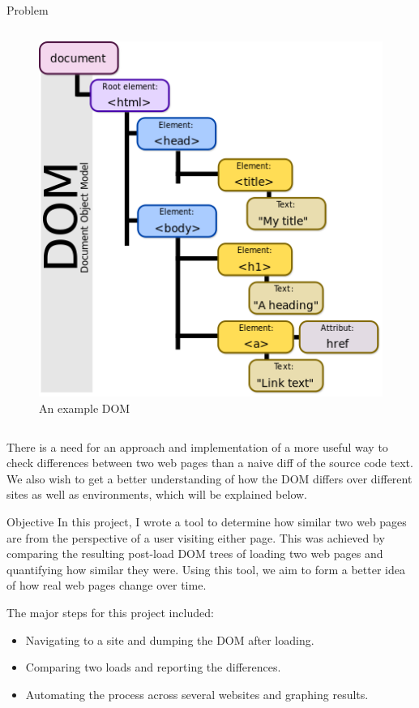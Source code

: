 \documentclass[final]{beamer}
\newlength{\halfcolwid}
\newlength{\onecolwid}
\begin{document}
\begin{frame}[t]
\begin{columns}[t]
\begin{column}{\onecolwid}
\begin{alertblock}{Problem}
\begin{columns}
\begin{column}{\halfcolwid} %
\begin{figure}
\includegraphics[width=0.6\linewidth]{dom.png}
\caption{An example DOM}
\end{figure}
\end{column}
\end{columns}
There is a need for an approach and implementation of a more useful way to check differences between two web pages than a naive diff of the source code text. We also wish to get a better understanding of how the DOM differs over different sites as well as environments, which will be explained below.
\end{alertblock}


\begin{block}{Objective}
In this project, I wrote a tool to determine how similar two web pages are from the perspective of a user visiting either page. This was achieved by comparing the resulting post-load DOM trees of loading two web pages and quantifying how similar they were. Using this tool, we aim to form a better idea of how real web pages change over time. 

The major steps for this project included:
\begin{itemize}
    \item Navigating to a site and dumping the DOM after loading.
    \item Comparing two loads and reporting the differences.
    \item Automating the process across several websites and graphing results.
\end{itemize}
\end{block}


\end{column}
\end{columns}
\end{frame}
\end{document}
